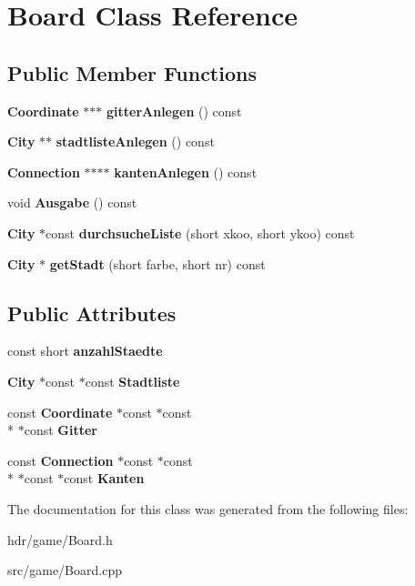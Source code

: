 \section{Board Class Reference}
\label{class_board}
\subsection*{Public Member Functions}
\begin{DoxyCompactItemize}
\item 
{\bf Coordinate} $\ast$$\ast$$\ast$ {\bfseries gitter\-Anlegen} () const \label{class_board_a4dc36c54ace7643e944d7a1c22489290}

\item 
{\bf City} $\ast$$\ast$ {\bfseries stadtliste\-Anlegen} () const \label{class_board_a673546f9b873b889391d4f5f00c8e11e}

\item 
{\bf Connection} $\ast$$\ast$$\ast$$\ast$ {\bfseries kanten\-Anlegen} () const \label{class_board_ad183860652e0761149da102dde1ed9d3}

\item 
void {\bfseries Ausgabe} () const \label{class_board_a027a9e9004d0d813a462deac6fc43762}

\item 
{\bf City} $\ast$const {\bfseries durchsuche\-Liste} (short xkoo, short ykoo) const \label{class_board_a3050c3b7275b6c71e0d03566d4e05d46}

\item 
{\bf City} $\ast$ {\bfseries get\-Stadt} (short farbe, short nr) const \label{class_board_a503bfdd2977525b7e660681bd5103900}

\end{DoxyCompactItemize}
\subsection*{Public Attributes}
\begin{DoxyCompactItemize}
\item 
const short {\bfseries anzahl\-Staedte}\label{class_board_af2f4b0e66fc22947fffc5d35557562bf}

\item 
{\bf City} $\ast$const $\ast$const {\bfseries Stadtliste}\label{class_board_a2dbb7565fffccb8319092b9f07c24db9}

\item 
const {\bf Coordinate} $\ast$const $\ast$const \\*
$\ast$const {\bfseries Gitter}\label{class_board_a4c2e87dffb506647f972d8104b6051cb}

\item 
const {\bf Connection} $\ast$const $\ast$const \\*
$\ast$const $\ast$const {\bfseries Kanten}\label{class_board_a648708bed67ceae1eaa438aa9dd48efb}

\end{DoxyCompactItemize}


The documentation for this class was generated from the following files\-:\begin{DoxyCompactItemize}
\item 
hdr/game/Board.\-h\item 
src/game/Board.\-cpp\end{DoxyCompactItemize}
